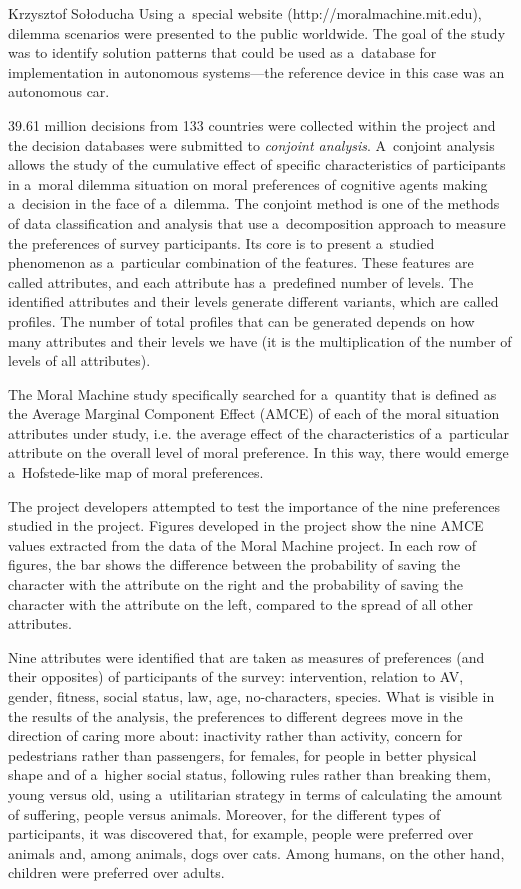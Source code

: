 \begin{artengenv}{Krzysztof Sołoducha}
Using a~special website (http://moralmachine.mit.edu), dilemma scenarios were presented to the public worldwide. The goal of the study was to identify solution patterns that could be used as a~database for implementation in autonomous systems—the reference device in this case was an autonomous car.

39.61 million decisions from 133 countries were collected within the project and the decision databases were submitted to \textit{conjoint analysis}. A~conjoint analysis allows the study of the cumulative effect of specific characteristics of participants in a~moral dilemma situation on moral preferences of cognitive agents making a~decision in the face of a~dilemma. The conjoint method is one of the methods of data classification and analysis that use a~decomposition approach to measure the preferences of survey participants. Its core is to present a~studied phenomenon as a~particular combination of the features. These features are called attributes, and each attribute has a~predefined number of levels. The identified attributes and their levels generate different variants, which are called profiles. The number of total profiles that can be generated depends on how many attributes and their levels we have (it is the multiplication of the number of levels of all attributes).

The Moral Machine study specifically searched for a~quantity that is defined as the Average Marginal Component Effect (AMCE) of each of the moral situation attributes under study, i.e. the average effect of the characteristics of a~particular attribute on the overall level of moral preference. In this way, there would emerge a~Hofstede-like map of moral preferences.

The project developers attempted to test the importance of the nine preferences studied in the project. Figures developed in the project show the nine AMCE values extracted from the data of the Moral Machine project. In each row of figures, the bar shows the difference between the probability of saving the character with the attribute on the right and the probability of saving the character with the attribute on the left, compared to the spread of all other attributes.

Nine attributes were identified that are taken as measures of preferences (and their opposites) of participants of the survey: intervention, relation to AV, gender, fitness, social status, law, age, no-characters, species. What is visible in the results of the analysis, the preferences to different degrees move in the direction of caring more about: inactivity rather than activity, concern for pedestrians rather than passengers, for females, for people in better physical shape and of a~higher social status, following rules rather than breaking them, young versus old, using a~utilitarian strategy in terms of calculating the amount of suffering, people versus animals. Moreover, for the different types of participants, it was discovered that, for example, people were preferred over animals and, among animals, dogs over cats. Among humans, on the other hand, children were preferred over adults.


\end{artengenv}
